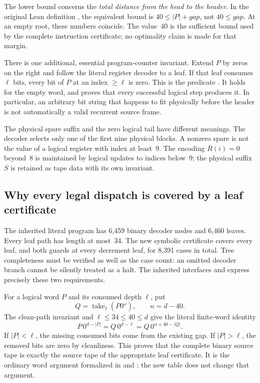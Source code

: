 The lower bound concerns the \emph{total distance from the head to the
header}.  In the original Lean definition
, the equivalent bound is
$40\le |P|+\mathit{gap}$, not $40\le\mathit{gap}$.  At an empty
root, these numbers coincide.  The value~40 is the sufficient bound
used by the complete instruction certificate; no optimality claim
is made for that margin.

There is one additional, essential program-counter invariant.  Extend
$P$ by zeros on the right and follow the literal register decoder to a
leaf.  If that leaf consumes $\ell$ bits, every bit of $P$ at an index
$\ge\ell$ is zero.  This is the predicate
.  It holds for the empty word, and
 proves that every successful
logical step produces it.  In particular, an arbitrary bit string
that happens to fit physically before the header is not automatically
a valid recurrent source frame.

The physical spare suffix and the zero logical tail have different
meanings.  The decoder selects only one of the first nine physical
blocks.  A nonzero spare is not the value of a logical register with
index at least~9.  The encoding $R(i)=0$ beyond~8 is maintained by
logical updates to indices below~9; the physical suffix $S$ is retained
as tape data with its own invariant.

\subsection{Why every legal dispatch is covered by a leaf certificate}

The inherited literal program has 6,459 binary decoder nodes and 6,460
leaves.  Every leaf path has length at most~34.  The new symbolic
certificate covers every leaf, and both guards at every decrement
leaf, for 8,391 cases in total.  Tree completeness must be verified
as well as the case count: an omitted decoder branch cannot be
silently treated as a halt.  The inherited interfaces
 and
 express precisely these two
requirements.

For a logical word $P$ and its consumed depth $\ell$, put
\[
 Q=\operatorname{take}_{\ell}(P0^\omega),\qquad n=d-40.
\]
The clean-path invariant and $\ell\le34\le40\le d$ give the literal
finite-word identity
\[
 P\,0^{d-|P|}=Q\,0^{d-\ell}
                =Q\,0^{n+40-|Q|}.
\tag{1}\label{eq:clean-rebase250}
\]
If $|P|<\ell$, the missing consumed bits come from the existing gap.
If $|P|>\ell$, the removed bits are zero by cleanliness.  This proves
that the complete binary source tape is exactly the source tape of the
appropriate leaf certificate.  It is the ordinary word argument
formalized in  and
; the new table
does not change that argument.


